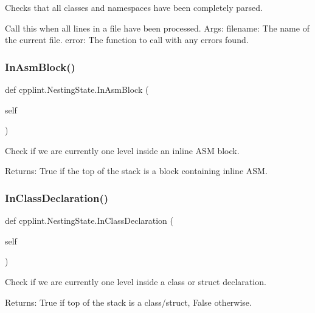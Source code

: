 \begin{DoxyVerb}Checks that all classes and namespaces have been completely parsed.

Call this when all lines in a file have been processed.
Args:
  filename: The name of the current file.
  error: The function to call with any errors found.
\end{DoxyVerb}
 \mbox{\label{classcpplint_1_1NestingState_aa35a529052e4863a477eae649ce778d2}} 
\subsubsection{\texorpdfstring{In\+Asm\+Block()}{InAsmBlock()}}
{\footnotesize\ttfamily def cpplint.\+Nesting\+State.\+In\+Asm\+Block (\begin{DoxyParamCaption}\item[{}]{self }\end{DoxyParamCaption})}

\begin{DoxyVerb}Check if we are currently one level inside an inline ASM block.

Returns:
  True if the top of the stack is a block containing inline ASM.
\end{DoxyVerb}
 \mbox{\label{classcpplint_1_1NestingState_a8e111c25149c41bd8927606244965b3c}} 
\subsubsection{\texorpdfstring{In\+Class\+Declaration()}{InClassDeclaration()}}
{\footnotesize\ttfamily def cpplint.\+Nesting\+State.\+In\+Class\+Declaration (\begin{DoxyParamCaption}\item[{}]{self }\end{DoxyParamCaption})}

\begin{DoxyVerb}Check if we are currently one level inside a class or struct declaration.

Returns:
  True if top of the stack is a class/struct, False otherwise.
\end{DoxyVerb}
 \mbox{\label{classcpplint_1_1NestingState_a67aa1907d42b8408c227ff18537071c7}} 
